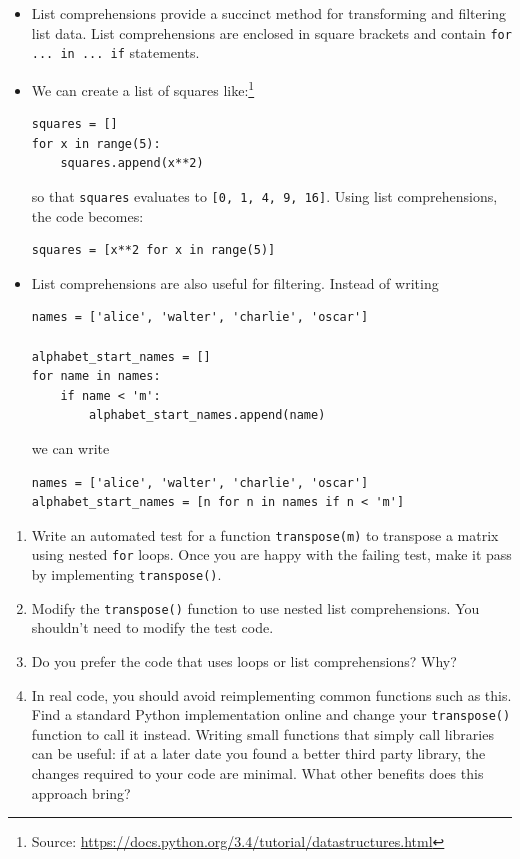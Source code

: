 \documentclass[a4paper,twoside,titlepage]{memoir}
\makeatletter
\newcommand{\FrameTitle}[2]{%
  \fboxrule=\FrameRule \fboxsep=\FrameSep
  \fbox{\vbox{\nobreak \vskip -0.7\FrameSep
    \rlap{\centerline{\strut#1}}\nobreak\nointerlineskip%
    \vskip 0.7\FrameSep
    \hbox{#2}}}}
\newenvironment{framewithtitle}[2][\FrameFirst@Lab\ (cont.)]{%
  \def\FrameFirst@Lab{\textbf{#2}}%
  \def\FrameCont@Lab{\textbf{#1}}%
  \def\FrameCommand##1{%
    \FrameTitle{\FrameFirst@Lab}{##1}}%
  \def\FirstFrameCommand##1{%
    \FrameTitle{\FrameFirst@Lab}{##1}}%
  \def\MidFrameCommand##1{%
    \FrameTitle{\FrameCont@Lab}{##1}}%
  \def\LastFrameCommand##1{%
    \FrameTitle{\FrameCont@Lab}{##1}}%
\MakeFramed{\advance\hsize-\width \FrameRestore}}%
{\endMakeFramed}
\newcounter{exercisectr}
\newenvironment{exercise}
{\refstepcounter{exercisectr}\begin{framewithtitle}{Practical \arabic{exercisectr}}}
{\end{framewithtitle}}
\newcommand{\shellcmd}{\texttt}
\makeatother
\begin{document}
\begin{itemize}
	\item List comprehensions provide a succinct method for transforming and filtering list data.  List comprehensions are enclosed in square brackets and contain \shellcmd{for ... in ... if} statements.

	\item We can create a list of squares like:\footnote{Source: \url{https://docs.python.org/3.4/tutorial/datastructures.html}}
\begin{verbatim}
squares = []
for x in range(5):
	squares.append(x**2)
\end{verbatim}
so that \shellcmd{squares} evaluates to \shellcmd{[0, 1, 4, 9, 16]}.  Using list comprehensions, the code becomes:
\begin{verbatim}
squares = [x**2 for x in range(5)]
\end{verbatim}

	\item List comprehensions are also useful for filtering.  Instead of writing
\begin{verbatim}
names = ['alice', 'walter', 'charlie', 'oscar']

alphabet_start_names = []
for name in names:
	if name < 'm':
		alphabet_start_names.append(name)
\end{verbatim}
we can write
\begin{verbatim}
names = ['alice', 'walter', 'charlie', 'oscar']
alphabet_start_names = [n for n in names if n < 'm']
\end{verbatim}
\end{itemize}

\begin{exercise}
\begin{enumerate}
	\item Write an automated test for a function \shellcmd{transpose(m)} to transpose a matrix using nested \shellcmd{for} loops.  Once you are happy with the failing test, make it pass by implementing \shellcmd{transpose()}.  
	\item Modify the \shellcmd{transpose()} function to use nested list comprehensions.  You shouldn't need to modify the test code.
	\item Do you prefer the code that uses loops or list comprehensions?  Why?
	\item In real code, you should avoid reimplementing common functions such as this.  Find a standard Python implementation online and change your \shellcmd{transpose()} function to call it instead.  Writing small functions that simply call libraries can be useful: if at a later date you found a better third party library, the changes required to your code are minimal.  What other benefits does this approach bring? %
\end{enumerate}
\end{exercise}
\end{document}
